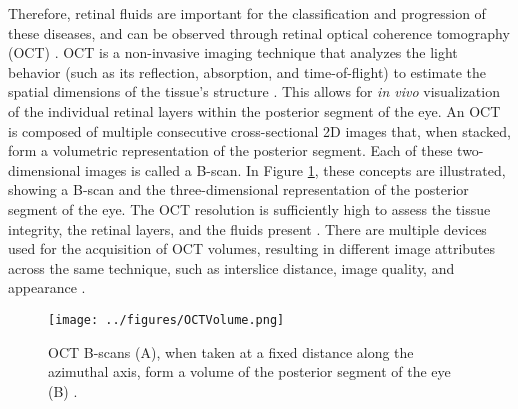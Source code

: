 Therefore, retinal fluids are important for the classification and progression of these diseases, and can be observed through retinal optical coherence tomography (OCT) \parencite{Bogunovic2019a}. OCT is a non-invasive imaging technique that analyzes the light behavior (such as its reflection, absorption, and time-of-flight) to estimate the spatial dimensions of the tissue's structure \parencite{Huang1991}. This allows for \textit{in vivo} visualization of the individual retinal layers within the posterior segment of the eye. An OCT is composed of multiple consecutive cross-sectional 2D images that, when stacked, form a volumetric representation of the posterior segment. Each of these two-dimensional images is called a B-scan. In Figure \ref{fig:OCTVolume}, these concepts are illustrated, showing a B-scan and the three-dimensional representation of the posterior segment of the eye. The OCT resolution is sufficiently high to assess the tissue integrity, the retinal layers, and the fluids present \parencite{Drexler2008, Viedma2022}. There are multiple devices used for the acquisition of OCT volumes, resulting in different image attributes across the same technique, such as interslice distance, image quality, and appearance \parencite{Bogunovic2019a}. 

\begin{figure}[!ht]
	\centering
	\texttt{[image: ../figures/OCTVolume.png]}
	\caption{OCT B-scans (A), when taken at a fixed distance along the azimuthal axis, form a volume of the posterior segment of the eye (B) \parencite{Jain2010}.}
	\label{fig:OCTVolume}
\end{figure}

